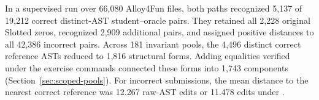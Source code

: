 In a supervised run over 66,080 Alloy4Fun files, both \CanDis{} paths
recognized 5,137 of 19,212 correct distinct-AST student--oracle
pairs. They retained all 2,228 original Slotted zeros, recognized
2,909 additional pairs, and assigned positive distances to all
42,386 incorrect pairs. Across 181 invariant pools, the
4,496 distinct correct reference ASTs reduced to 1,816 structural
forms. Adding equalities verified under the exercise commands connected these
forms into 1,743 components (Section~\ref{sec:scoped-pools}).
For incorrect submissions, the mean distance to the nearest correct reference
was 12.267 raw-AST edits or 11.478 edits under \CanDis{}.
